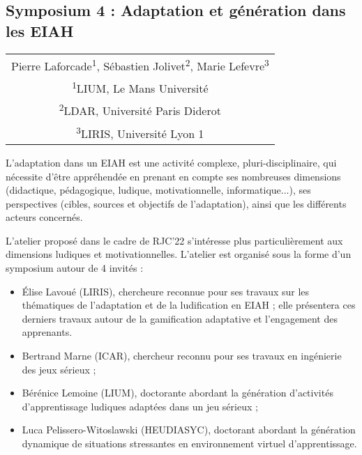 \newpage

\vspace*{2em}
\begin{center}
	\subsection{Symposium 4 : Adaptation et génération dans les EIAH}
\end{center}

\vspace{1em}
\begin{center}
	\begin{tabular}{@{}c@{}}
		Pierre Laforcade\textsuperscript{1}, Sébastien Jolivet\textsuperscript{2}, Marie Lefevre\textsuperscript{3}\\
		\textsuperscript{1}LIUM, Le Mans Université\\
		\textsuperscript{2}LDAR, Université Paris Diderot\\
		\textsuperscript{3}LIRIS, Université Lyon 1
	\end{tabular}
\end{center}

\vspace{2em}

L’adaptation dans un EIAH est une activité complexe, pluri-disciplinaire, qui nécessite d’être appréhendée en prenant en compte ses nombreuses dimensions (didactique, pédagogique, ludique, motivationnelle, informatique...), ses perspectives (cibles, sources et objectifs de l’adaptation), ainsi que les différents acteurs concernés.

L’atelier proposé dans le cadre de RJC’22 s’intéresse plus particulièrement aux dimensions ludiques et motivationnelles. L’atelier est organisé sous la forme d’un symposium autour de 4 invités :

\begin{itemize}
	\item Élise Lavoué (LIRIS), chercheure reconnue pour ses travaux sur les thématiques de l’adaptation et de la ludification en EIAH ; elle présentera ces derniers travaux autour de la gamification adaptative et l’engagement des apprenants.
	\item Bertrand Marne (ICAR), chercheur reconnu pour ses travaux en ingénierie des jeux sérieux ;
	\item Bérénice Lemoine (LIUM), doctorante abordant la génération d’activités d’apprentissage ludiques adaptées dans un jeu sérieux ;
	\item Luca Pelissero-Witoslawski (HEUDIASYC), doctorant abordant la génération dynamique de situations stressantes en environnement virtuel d’apprentissage.
\end{itemize}